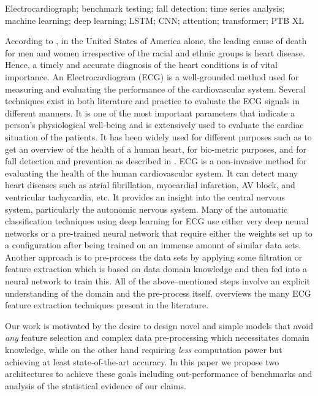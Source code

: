 \documentclass{ieeeaccess}
\begin{document}
\begin{IEEEkeywords}Electrocardiograph; benchmark testing; fall detection; time series analysis; machine learning; deep learning; LSTM; CNN; attention; transformer; PTB XL\end{IEEEkeywords}

\titlepgskip=-15pt

\maketitle

{According to} \cite{cdc}, in the United States of America alone, the leading cause of death for men and women irrespective of the racial and ethnic groups is heart disease. Hence, a timely and accurate diagnosis of the heart conditions is of vital importance. An Electrocardiogram (ECG) is a well-grounded method used for measuring and evaluating the performance of the cardiovascular system. Several techniques exist in both literature and practice to evaluate the ECG signals in different manners. It is one of the most important parameters that indicate a person's physiological well-being and is extensively used to evaluate the cardiac situation of the patients. It has been widely used for different purposes such as to get an overview of the health of a human heart, for bio-metric purposes, and for fall detection and prevention as described in \cite{fallcardio}.
ECG is a non-invasive method for evaluating the health of the human cardiovascular system. It can detect many heart diseases such as atrial fibrillation, myocardial infarction, AV block, and ventricular tachycardia, etc. It provides an insight into the central nervous system, particularly the autonomic nervous system.
Many of the automatic classification techniques using deep learning for ECG use either very deep neural networks or a pre-trained neural network that require either the weights set up to a configuration after being trained on an immense amount of similar data sets. Another approach is to pre-process the data sets by applying some filtration or feature extraction which is based on data domain knowledge and then fed into a neural network to train this. All of the above--mentioned steps involve an explicit understanding of the domain and the pre-process itself. \cite{karpagachelvi2010ecg} overviews the many ECG feature extraction techniques present in the literature.

Our work is motivated by the desire to design novel and simple models that avoid \emph{any} feature selection and complex data pre-processing which necessitates domain knowledge, while on the other hand requiring \emph{less} computation power but achieving at least state-of-the-art accuracy. In this paper we propose two architectures to achieve these goals including out-performance of benchmarks and analysis of the statistical evidence of our claims.
\end{document}
